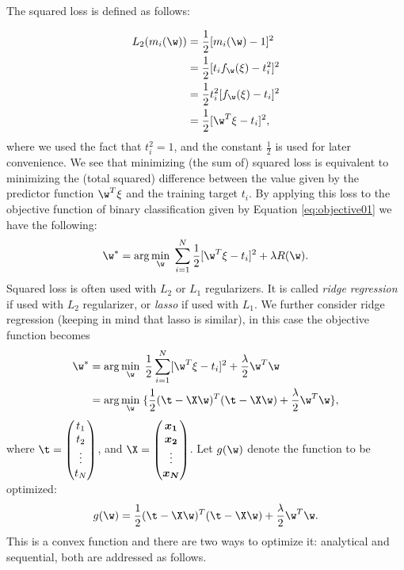 The squared loss is defined as follows:

\[ \begin{split}
L_2(m_i(\w)) &= \frac{1}{2}[m_i(\w) - 1]^2 \\
& = \frac{1}{2}[t_i f_{\w}(\xi) - t_i^2]^2 \\
& = \frac{1}{2}t_i^2 [f_{\w}(\xi) - t_i]^2 \\
& = \frac{1}{2}[\w^T\xi - t_i]^2,
\end{split} \] 
where we used the fact that $t_i^2 = 1$, and the constant $\frac{1}{2}$ is used for later convenience. We see that minimizing (the sum of) squared loss is equivalent to minimizing the (total squared) difference between the value given by the predictor function $\w^T\xi$ and the training target $t_i$. By applying this loss to the objective function of binary classification given by Equation \ref{eq:objective01} we have the following:
\begin{equation}
\label{eq:squareobj}
\w^* = \arg\min_{\w} \; \sum_{i=1}^{N}  \frac{1}{2}[\w^T\xi - t_i]^2 + \lambda R(\w).
\end{equation}
Squared loss is often used with $L_2$ or $L_1$ regularizers. It is called \emph{ridge regression} if used with $L_2$ regularizer, or \emph{lasso} if used with $L_1$. We further consider ridge regression (keeping in mind that lasso is similar), in this case the objective function becomes 
\[ \begin{split}
\w^* & = \arg\min_{\w} \;  \frac{1}{2} \sum_{i=1}^{N} [\w^T\xi - t_i]^2 + \frac{\lambda}{2} \w^T\w \\
& = \arg\min_{\w} \; \{  \frac{1}{2}(\t - \X\w)^T(\t - \X\w) + \frac{\lambda}{2} \w^T\w \},
\end{split} \]
where 
$\t = \begin{pmatrix} t_1\\ t_2 \\ \vdots \\ t_N \end{pmatrix}$, and 
$\X = \begin{pmatrix} \boldsymbol{x_1}\\ \boldsymbol{x_2}\\ \vdots \\ \boldsymbol{x_N}\end{pmatrix}$. 
Let $g(\w)$ denote the function to be optimized: 
$$ g(\w) = \frac{1}{2}(\t - \X\w)^T(\t - \X\w) + \frac{\lambda}{2} \w^T\w.$$
This is a convex function and there are two ways to optimize it: analytical and sequential, both are addressed as follows.

